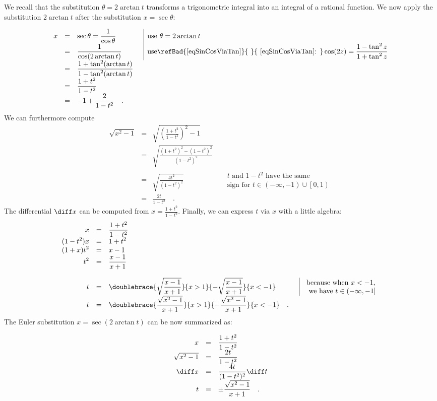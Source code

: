 We recall that the substitution $\theta = 2\arctan t$ transforms a trigonometric integral into an integral of a rational function. We now apply the substitution $2\arctan t$ after the substitution $x=\sec \theta$:

\begin{equation*}
\begin{array}{rcll|l}
x&=&\displaystyle \sec \theta=\frac{1}{\cos \theta} && \text{use } \theta =2 \arctan t\\
&=&\displaystyle \frac{1} {\cos(2\arctan t)} && \text{use\refBad{\ref{eqSinCosViaTan}}{ }{ \eqref{eqSinCosViaTan}: }} \displaystyle \cos (2z) = \frac{ 1- \tan^2 z}{1+ \tan^2 z}\\
&=& \displaystyle \frac{1+\tan^2(\arctan t)}{1-\tan^2( \arctan t)} \\
&=&\displaystyle \frac{1+t^2}{1-t^2}\\
&=&\displaystyle-1+\frac{2}{1-t^2} \quad .
\end{array}
\end{equation*}
We can furthermore compute
\begin{equation}\label{eqsqrtxsquareminus1E2}
\begin{array}{rcll|l}
\sqrt{x^2-1 }&=&\displaystyle \sqrt{ \left(\frac{1+t^2}{1-t^2}\right)^2-1}\\
&=& \displaystyle \sqrt{\frac{(1+t^2)^2-(1-t^2)^2}{(1-t^2)^2} }\\
&=& \displaystyle \sqrt{\frac{4t^2}{(1-t^2)^2}} && \begin{array}{l} \displaystyle t \text{ and }1-t^2\text{ have the same}\\ \text{sign for } t\in (-\infty, -1) \cup \left[0, 1 \right)\end{array} \\
&=&\displaystyle \frac{2t}{1-t^2}\quad .
\end{array}
\end{equation}
The differential $\diff x$ can be computed from $x=\frac{1+t^2}{1-t^2}$. Finally, we can express $t$ via $x$ with a little algebra:
\[
\begin{array}{rcll|l}
\displaystyle x&=&\displaystyle  \frac{1+t^2}{ 1- t^2} \\
\displaystyle (1- t^2)x&=&\displaystyle  1+t^2\\
\displaystyle (1+ x)t^2&=&\displaystyle  x-1\\
\displaystyle t^2&=&\displaystyle  \frac{x-1}{x+1}\\
\\
\displaystyle t&=&\displaystyle \doublebrace{ \sqrt{\frac{x-1}{x+1}}}{x>1}{-\sqrt{\frac{x-1}{x+1}}}{x<-1} &&\begin{array}{l} \text{because when } x<-1, \\ \text{ we have } t\in \left( -\infty , -1 \right]\end{array} \\
\displaystyle t&=&\displaystyle \doublebrace{ \frac{\sqrt{ x^2 -1}}{x+1}}{x>1}{-\frac{\sqrt{x^2-1}}{x+1}}{x<-1}  \quad .
\end{array}
\]
The Euler substitution $x= \sec (2\arctan t)$ can be now summarized as:

\[
\begin{array}{rcl}
x&=&\displaystyle \frac{1+t^2}{1-t^2}\\
\sqrt{x^2-1}&=&\displaystyle \frac{2t}{1-t^2}  \\
\diff x&=&\displaystyle  \frac{4 t}{(1- t^{2})^{2}} \diff t\\
t&=&\displaystyle \pm \frac{ \sqrt{x^2-1}}{x+1} \quad .
\end{array}
\]